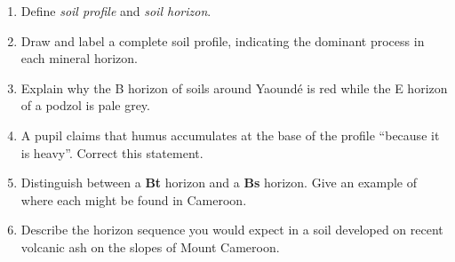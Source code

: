 \documentclass[11pt]{article}
\begin{document}
\begin{exercice}
\begin{enumerate}
\item Define \emph{soil profile} and \emph{soil horizon}.
\item Draw and label a complete soil profile, indicating the dominant process in each mineral horizon.
\item Explain why the B horizon of soils around Yaoundé is red while the E horizon of a podzol is pale grey.
\item A pupil claims that humus accumulates at the base of the profile ``because it is heavy''. Correct this statement.
\item Distinguish between a \textbf{Bt} horizon and a \textbf{Bs} horizon. Give an example of where each might be found in Cameroon.
\item Describe the horizon sequence you would expect in a soil developed on recent volcanic ash on the slopes of Mount Cameroon.
\end{enumerate}
\end{exercice}
\end{document}
